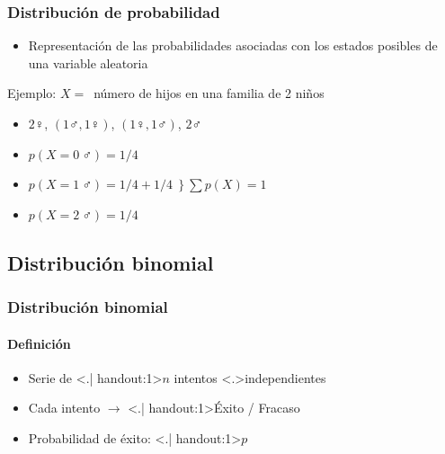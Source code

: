 \documentclass[mathserif]{beamer}
\begin{document}
\begin{frame}[label=probadist]
   \frametitle{Distribuci\'on de probabilidad}
   \begin{itemize}
      \item Representaci\'on de las probabilidades asociadas con los estados posibles de una variable aleatoria
   \end{itemize}
   \begin{exampleblock}{Ejemplo: $X=$~n\'umero de hijos en una familia de 2 ni\~nos}
      \begin{itemize}
         \item $2\female$, $(1\male, 1\female)$, $(1\female, 1\male)$, $2\male$
         \item $p(X = 0~\male) = 1/4$
         \item $ p(X = 1~\male) = 1/4 + 1/4 ~~ \Bigg\}~  \sum p(X)=1$ 
         \item $p(X = 2~\male) = 1/4$
      \end{itemize}
   \end{exampleblock}
\end{frame}%


\subsection[Binomial]{Distribuci\'on binomial}

\begin{frame}[label=binom1]
   \frametitle{Distribuci\'on binomial}
   \framesubtitle{Definici\'on}
   \begin{itemize}[<+-| handout:1>]
      \item Serie de \alert<.| handout:1>{$n$} intentos \alert<.>{independientes}
      \item Cada intento $\rightarrow$ \alert<.| handout:1>{\'Exito / Fracaso}
      \item Probabilidad de \'exito: \alert<.| handout:1>{$p$}
   \end{itemize}
\end{frame}%
\end{document}
